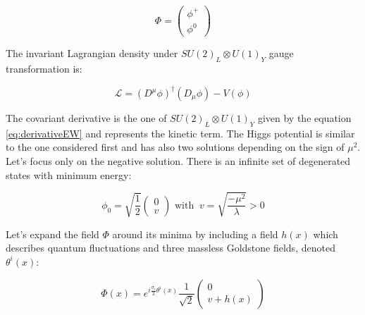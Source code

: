     \begin{equation}
       \Phi = \begin{pmatrix}
                \phi^{+}\\
                \phi^{0}
              \end{pmatrix}
    \end{equation}

     The invariant Lagrangian density under $SU(2)_L \otimes U(1)_Y$ gauge transformation is:

    \begin{equation}
      \mathcal{L} = \left(D^{\mu} \phi \right)^{\dagger} \left( D_{\mu} \phi \right) - V(\phi)
      \label{eq:lagrangianHiggs}
    \end{equation}    
    
    The covariant derivative is the one of $SU(2)_L \otimes U(1)_Y$ given by the equation \ref{eq:derivativeEW} and represents the kinetic term.
    The Higgs potential is similar to the one considered first and has also two solutions depending on the sign of $\mu^2$.
    Let's focus only on the negative solution. 
    There is an infinite set of degenerated states with minimum energy:

    \begin{equation}
      \phi_0 = \sqrt{\frac{1}{2}}
      \begin{pmatrix}
        0 \\
        v
      \end{pmatrix}
      \text{ with } \ v = \sqrt{\frac{- \mu^2}{\lambda}} > 0
      \label{eq:v}
    \end{equation}

    Let's expand the field $\Phi$ around its minima by including a field $h(x)$ which describes quantum fluctuations and three massless Goldstone fields, denoted $\theta^i(x)$:

    \begin{equation}
      \Phi(x) = e^{i\frac{\sigma_i}{2}\theta^i(x)} \frac{1}{\sqrt{2}}
                \begin{pmatrix}
                   0 \\
                   v + h(x)
                 \end{pmatrix}
      \label{eq:fieldHiggs}
    \end{equation}

     

